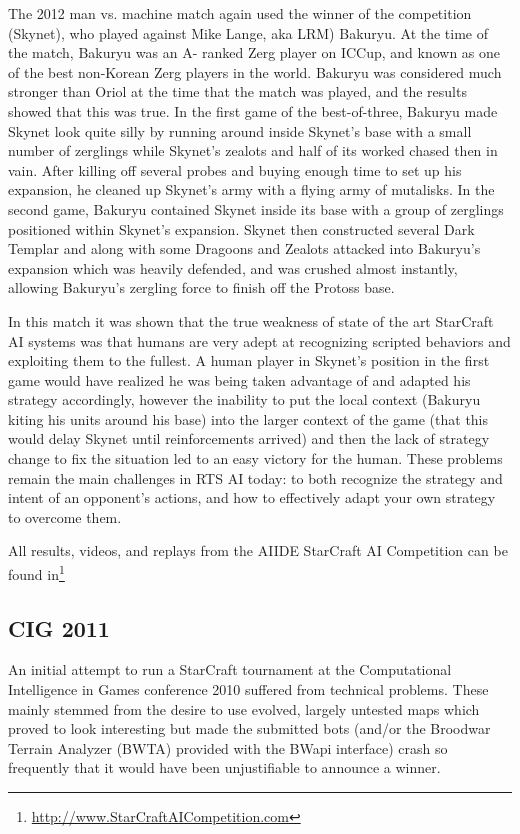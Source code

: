 \documentclass[journal]{IEEEtran}
\begin{document}
The 2012 man vs. machine match again used the winner of the competition (Skynet), who played against
Mike Lange, aka LRM) Bakuryu. At the time of the match, Bakuryu was an A- ranked Zerg player on ICCup,
and known as one of the best non-Korean Zerg players in the world. Bakuryu was considered much
stronger than Oriol at the time that the match was played, and the results showed that this was true.
In the first game of the best-of-three, Bakuryu made Skynet look quite silly by running around inside
Skynet's base with a small number of zerglings while Skynet's zealots and half of its worked chased
then in vain. After killing off several probes and buying enough time to set up his expansion, he
cleaned up Skynet's army with a flying army of mutalisks. In the second game, Bakuryu contained Skynet
inside its base with a group of zerglings positioned within Skynet's expansion. Skynet then constructed
several Dark Templar and along with some Dragoons and Zealots attacked into Bakuryu's expansion which
was heavily defended, and was crushed almost instantly, allowing Bakuryu's zergling force to finish
off the Protoss base. 

In this match it was shown that the true weakness of state of the art StarCraft AI systems was that
humans are very adept at recognizing scripted behaviors and exploiting them to the fullest. A human
player in Skynet's position in the first game would have realized he was being taken advantage of and
adapted his strategy accordingly, however the inability to put the local context (Bakuryu kiting his
units around his base) into the larger context of the game (that this would delay Skynet until
reinforcements arrived) and then the lack of strategy change to fix the situation led to an easy
victory for the human. These problems remain the main challenges in RTS AI today: to both recognize
the strategy and intent of an opponent's actions, and how to effectively adapt your own strategy to 
overcome them.

All results, videos, and replays from the AIIDE StarCraft AI Competition can be found in\footnote{\url{http://www.StarCraftAICompetition.com}}



\subsection{CIG 2011}
\label{sec:cig2011}

An initial attempt to run a StarCraft tournament at the Computational
Intelligence in Games conference 2010 suffered from technical problems.
These mainly stemmed from the desire to use evolved, largely untested
maps which proved to look interesting but made the submitted bots 
(and/or the Broodwar Terrain Analyzer (BWTA) provided with the BWapi interface) crash
so frequently that it would have been unjustifiable to announce a winner.
\end{document}
